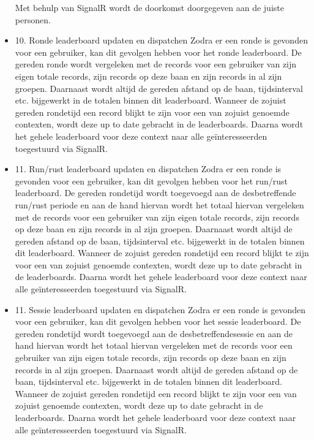 \begin{itemize}
Met behulp van SignalR wordt de doorkomst doorgegeven aan de juiste personen.

\item 10. Ronde leaderboard updaten en dispatchen
Zodra er een ronde is gevonden voor een gebruiker, kan dit gevolgen hebben voor het ronde leaderboard. De gereden ronde wordt vergeleken met de records voor een gebruiker van zijn eigen totale records, zijn records op deze baan en zijn records in al zijn groepen. Daarnaast wordt altijd de gereden afstand op de baan, tijdsinterval etc. bijgewerkt in de totalen binnen dit leaderboard. Wanneer de zojuist gereden rondetijd een record blijkt te zijn voor een van zojuist genoemde contexten, wordt deze up to date gebracht in de leaderboards. Daarna wordt het gehele leaderboard voor deze context naar alle geïnteresseerden toegestuurd via SignalR.

\item 11. Run/rust leaderboard updaten en dispatchen
Zodra er een ronde is gevonden voor een gebruiker, kan dit gevolgen hebben voor het run/rust leaderboard. De gereden rondetijd wordt toegevoegd aan de desbetreffende run/rust periode en aan de hand hiervan wordt het totaal hiervan vergeleken met de records voor een gebruiker van zijn eigen totale records, zijn records op deze baan en zijn records in al zijn groepen. Daarnaast wordt altijd de gereden afstand op de baan, tijdsinterval etc. bijgewerkt in de totalen binnen dit leaderboard. Wanneer de zojuist gereden rondetijd een record blijkt te zijn voor een van zojuist genoemde contexten, wordt deze up to date gebracht in de leaderboards. Daarna wordt het gehele leaderboard voor deze context naar alle geïnteresseerden toegestuurd via SignalR.

\item 11. Sessie leaderboard updaten en dispatchen
Zodra er een ronde is gevonden voor een gebruiker, kan dit gevolgen hebben voor het sessie leaderboard. De gereden rondetijd wordt toegevoegd aan de desbetreffendesessie en aan de hand hiervan wordt het totaal hiervan vergeleken met de records voor een gebruiker van zijn eigen totale records, zijn records op deze baan en zijn records in al zijn groepen. Daarnaast wordt altijd de gereden afstand op de baan, tijdsinterval etc. bijgewerkt in de totalen binnen dit leaderboard. Wanneer de zojuist gereden rondetijd een record blijkt te zijn voor een van zojuist genoemde contexten, wordt deze up to date gebracht in de leaderboards. Daarna wordt het gehele leaderboard voor deze context naar alle geïnteresseerden toegestuurd via SignalR.


\end{itemize}
